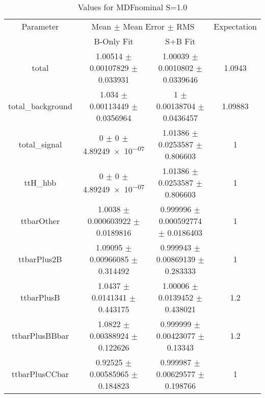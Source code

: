 \begin{table}
\centering
\caption{Values for MDFnominal S=1.0}
\begin{tabular}{cccc}
\toprule
Parameter & \multicolumn{2}{c}{Mean $\pm$ Mean Error $\pm$ RMS} & Expectation\\
 & B-Only Fit & S+B Fit & \\
\midrule
total & \num{1.00514} $\pm$ \num{0.00107829} $\pm$ \num{0.033931} & \num{1.00039} $\pm$ \num{0.0010802} $\pm$ \num{0.0339646} & \num{1.0943}\\
total\_background & \num{1.034} $\pm$ \num{0.00113449} $\pm$ \num{0.0356964} & \num{1} $\pm$ \num{0.00138704} $\pm$ \num{0.0436457} & \num{1.09883}\\
total\_signal & \num{0} $\pm$ \num{0} $\pm$ \num{4.89249e-07} & \num{1.01386} $\pm$ \num{0.0253587} $\pm$ \num{0.806603} & \num{1}\\
ttH\_hbb & \num{0} $\pm$ \num{0} $\pm$ \num{4.89249e-07} & \num{1.01386} $\pm$ \num{0.0253587} $\pm$ \num{0.806603} & \num{1}\\
ttbarOther & \num{1.0038} $\pm$ \num{0.000603922} $\pm$ \num{0.0189816} & \num{0.999996} $\pm$ \num{0.000592774} $\pm$ \num{0.0186403} & \num{1}\\
ttbarPlus2B & \num{1.09095} $\pm$ \num{0.00966085} $\pm$ \num{0.314492} & \num{0.999943} $\pm$ \num{0.00869139} $\pm$ \num{0.283333} & \num{1}\\
ttbarPlusB & \num{1.0437} $\pm$ \num{0.0141341} $\pm$ \num{0.443175} & \num{1.00006} $\pm$ \num{0.0139452} $\pm$ \num{0.438021} & \num{1.2}\\
ttbarPlusBBbar & \num{1.0822} $\pm$ \num{0.00388924} $\pm$ \num{0.122626} & \num{0.999999} $\pm$ \num{0.00423077} $\pm$ \num{0.13343} & \num{1.2}\\
ttbarPlusCCbar & \num{0.92525} $\pm$ \num{0.00585965} $\pm$ \num{0.184823} & \num{0.999987} $\pm$ \num{0.00629577} $\pm$ \num{0.198766} & \num{1}\\
\bottomrule
\end{tabular}
\end{table}